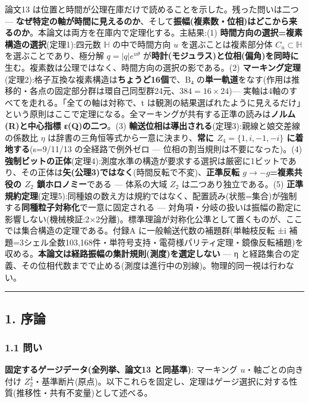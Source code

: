 \documentclass[
]{ltjsarticle}
\begin{document}
論文13 は位置と時間が公理在庫だけで読めることを示した。残った問いは二つ
---
\textbf{なぜ特定の軸が時間に見えるのか}、そして\textbf{振幅(複素数・位相)はどこから来るのか}。本論文は両方を在庫内で定理化する。主結果:(1)
\textbf{時間方向の選択=複素構造の選択}(定理1):四元数 \(\mathbb{H}\)
の中で時間方向 \(u\) を選ぶことは複素部分体 \(C_u\subset\mathbb{H}\)
を選ぶことであり、極分解 \(q=|q|e^{u\theta}\)
が\textbf{時計(モジュラス)と位相(偏角)を同時に}生む。複素数は公理ではなく、時間方向の選択の影である。(2)
\textbf{マーキング定理}(定理2):格子互換な複素構造は\textbf{ちょうど16個}で、B₄
の\textbf{単一軌道}をなす(作用は推移的・各点の固定部分群は環自己同型群24元、\(384=16\times24\))---
実軸は4軸のすべてを走れる。「全ての軸は対称で、t
は観測の結果選ばれたように見えるだけ」という原則はここで定理になる。全マーキングが共有する正準の読みは\textbf{ノルム(R)と中心指標
ε(Q)の二つ}。(3)
\textbf{輸送位相は導出される}(定理3):親線と娘交差線の係数比 \(\eta\)
は辞書の三角恒等式から一意に決まり、\textbf{常に \(Z_4=\{1,i,-1,-i\}\)
に着地する}(s=9/11/13 の全経路で例外ゼロ ---
位相の割当規則は不要になった)。(4)
\textbf{強制ビットの正体}(定理4):測度水準の構造が要求する選択は厳密に1ビットであり、その正体は\textbf{矢(公理3)ではなく}(時間反転で不変)、\textbf{正準反転
\(g\to-g\)=複素共役の \(Z_2\) 鎖ホロノミー}である --- 体系の大域 \(Z_2\)
は二つあり独立である。(5)
\textbf{正準規約定理}(定理5):同種娘の数え方は規約ではなく、配置読み(状態=集合)が強制する\textbf{同種粒子対称化}で一意に固定される
---
対角項・分岐の扱いは振幅の勘定に影響しない(機械検証:2×2分離)。標準理論が対称化公準として置くものが、ここでは集合構造の定理である。付録A
に一般輸送代数の補題群(単軸枝反転 ±i
補題=3シェル全数103,168件・単符号支持・電荷様パリティ定理・鏡像反転補題)を収める。\textbf{本論文は経路振幅の集計規則(測度)を選定しない}
--- η
と経路集合の定義、その位相代数までで止める(測度は進行中の別線)。物理的同一視は行わない。

\begin{center}\rule{0.5\linewidth}{0.5pt}\end{center}

\subsection{1. 序論}\label{ux5e8fux8ad6}

\subsubsection{1.1 問い}\label{ux554fux3044}

\textbf{固定するゲージデータ(全列挙、論文13 と同基準)}: マーキング
\(u\)・軸ごとの向き付け
\(Z_2^{4}\)・基準断片(原点)。以下これらを固定し、定理はゲージ選択に対する性質(推移性・共有不変量)として述べる。
\end{document}
